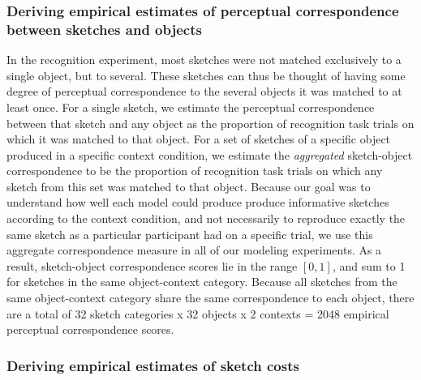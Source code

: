 \documentclass[9pt,twocolumn,twoside]{pnas-new}
\begin{document}
{\subsubsection*{Deriving empirical estimates of perceptual correspondence between sketches and objects}

In the recognition experiment, most sketches were not matched exclusively to a single object, but to several. 
These sketches can thus be thought of having some degree of perceptual correspondence to the several objects it was matched to at least once. 
For a single sketch, we estimate the perceptual correspondence between that sketch and any object as the proportion of recognition task trials on which it was matched to that object. 
For a set of sketches of a specific object produced in a specific context condition, we estimate the \textit{aggregated} sketch-object correspondence to be the proportion of recognition task trials on which any sketch from this set was matched to that object. 
Because our goal was to understand how well each model could produce produce informative sketches according to the context condition, and not necessarily to reproduce exactly the same sketch as a particular participant had on a specific trial, we use this aggregate correspondence measure in all of our modeling experiments.  
As a result, sketch-object correspondence scores lie in the range $[0,1]$, and sum to 1 for sketches in the same object-context category. 
Because all sketches from the same object-context category share the same correspondence to each object, there are a total of 32 sketch categories x 32 objects x 2 contexts = 2048 empirical perceptual correspondence scores.






\subsubsection*{Deriving empirical estimates of sketch costs}

}
\end{document}
